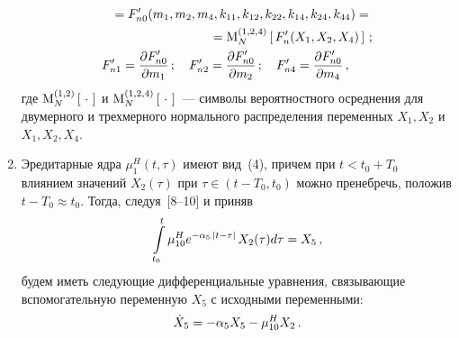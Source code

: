 \begin{multicols}{2}
\begin{enumerate}[1{$^\circ$}]
\begin{align*}
&\!\!\!\!\!{}= F_{n0}' (m_1, m_2, m_4, k_{11}, k_{12}, k_{22}, k_{14}, k_{24}, k_{44})={}\\
&\ \ \ \ \ \ \ \ \ \ \ \ \ \ \ \ \ \ \ \ \ {}= {\rm M}_N^{(1,2,4)} \left[\, F_n' (X_1, X_2, X_4)\,\right]\,;\\
F_{n1}' &=\displaystyle\frac{\displaystyle \partial F_{n0}'\mathstrut}{\displaystyle \partial m_1\mathstrut}\,;\quad F_{n2}' =\displaystyle\frac{\displaystyle \partial F_{n0}'\mathstrut}{\displaystyle \partial m_2\mathstrut}\,;
\quad F_{n4}' =\displaystyle\frac{\displaystyle \partial F_{n0}'\mathstrut}{\displaystyle \partial m_4\mathstrut}\,,
\end{align*}
где  ${\rm M}_N^{(1,2)} \left[\,\, \cdot\, \,\right]$ и ${\rm M}_N^{(1,2,4)} \left[\,\,
\cdot\, \,\right]$~--- символы вероятностного осреднения для двумерного и
трехмерного нормального распределения переменных $X_1, X_2$  и
$X_1,X_2, X_4$.
\item
Эредитарные ядра  $\mu_1^H (t,\tau)$ имеют вид~(4), причем при
$t<t_0+T_0$ влиянием значений $X_2(\tau)$ при  $\tau \in (t-T_0,
t_0)$ можно пренебречь, положив  $t- T_0 \approx t_0$. Тогда, 
следуя~[8--10] и приняв
    \begin{equation*}
\int\limits_{t_0}^t \mu_{10}^H e^{-\alpha_5 \,\left\vert t-\tau\right\vert\,} X_2 (\tau) d\tau = X_5\,,
\end{equation*}
будем иметь следующие дифференциальные уравнения, связывающие
вспомогательную переменную  $X_5$ с исходными переменными:
\begin{equation*}
\dot X_5 = -\alpha_5 X_5 -\mu_{10}^H X_2\,.
\end{equation*}
\end{enumerate}



\end{multicols}
